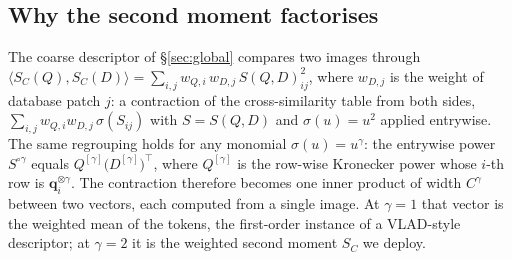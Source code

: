 \FloatBarrier

\subsection{Why the second moment factorises}
\label{app:factorize}
The coarse descriptor of \S\ref{sec:global} compares two images through $\langle S_C(Q),S_C(D)\rangle=\sum_{i,j} w_{Q,i}\,w_{D,j}\,S(Q,D)_{ij}^{2}$, where $w_{D,j}$ is the weight of database patch $j$: a contraction of the cross-similarity table from both sides, $\sum_{i,j} w_{Q,i}w_{D,j}\,\sigma(S_{ij})$ with $S=S(Q,D)$ and $\sigma(u)=u^{2}$ applied entrywise. The same regrouping holds for any monomial $\sigma(u)=u^{\gamma}$: the entrywise power $S^{\circ\gamma}$ equals $Q^{[\gamma]}\big(D^{[\gamma]}\big)^{\top}$, where $Q^{[\gamma]}$ is the row-wise Kronecker power whose $i$-th row is $\mathbf q_i^{\otimes\gamma}$. The contraction therefore becomes one inner product of width $C^{\gamma}$ between two vectors, each computed from a single image. At $\gamma{=}1$ that vector is the weighted mean of the tokens, the first-order instance of a VLAD-style descriptor; at $\gamma{=}2$ it is the weighted second moment $S_C$ we deploy.

